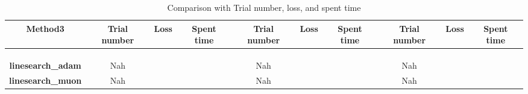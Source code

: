 \begin{table}[htbp]
\begin{tabular}{c|c|c|c|c|c|c|c|c|c}
\textbf{Method3}
& Trial number & Loss & Spent time
& Trial number & Loss & Spent time
& Trial number & Loss & Spent time \\
\hline
& & & & & & & & & \\
\hline
& & & & & & & & & \\
\hline
& & & & & & & & & \\
\hline
\textbf{linesearch_adam}
& Nah & & 
& Nah & & 
& Nah & & \\
\hline
\textbf{linesearch_muon}
& Nah & & 
& Nah & & 
& Nah & & \\
\hline
\end{tabular}
\caption{Comparison with Trial number, loss, and spent time}
\end{table}
